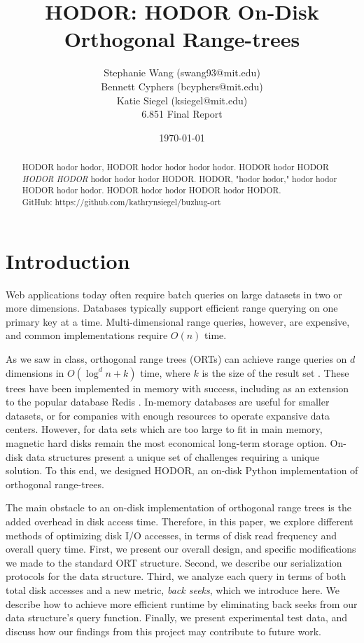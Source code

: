 \documentclass[11pt, oneside]{article}
\title{HODOR: HODOR On-Disk Orthogonal Range-trees}
\author{Stephanie Wang (swang93@mit.edu)\\
Bennett Cyphers (bcyphers@mit.edu)\\
Katie Siegel (ksiegel@mit.edu)\\[2ex]
6.851 Final Report}
\date{\today}
\begin{document}
\maketitle

\vfill

\begin{abstract}

    HODOR hodor hodor, HODOR hodor hodor hodor hodor. HODOR hodor HODOR
    \textit{HODOR HODOR} hodor hodor hodor HODOR. HODOR, "hodor hodor," hodor
    hodor HODOR hodor hodor. HODOR hodor hodor HODOR hodor HODOR. \\

    GitHub: https://github.com/kathrynsiegel/buzhug-ort

\end{abstract}

\clearpage

\section{Introduction}

Web applications today often require batch queries on large datasets in two or
more dimensions. Databases typically support efficient range querying on one
primary key at a time. Multi-dimensional range queries, however, are expensive,
and common implementations require $O(n)$ time. 

As we saw in class, orthogonal range trees (ORTs) can achieve range queries on $d$
dimensions in $O(\log^{d} n + k)$ time, where $k$ is the size of the result set
\cite{lecture}. These trees have been implemented in memory with success,
including as an extension to the popular database Redis \cite{redis}. In-memory
databases are useful for smaller datasets, or for companies with enough
resources to operate expansive data centers. However, for data sets
which are too large to fit in main memory, magnetic hard disks remain the most
economical long-term storage option. On-disk data structures present a unique
set of challenges requiring a unique solution. To this end, we designed HODOR,
an on-disk Python implementation of orthogonal range-trees. 

The main obstacle to an on-disk implementation of orthogonal range trees is the
added overhead in disk access time. Therefore, in this paper, we explore
different methods of optimizing disk I/O accesses, in terms of disk read
frequency and overall query time. First, we present our overall design, and
specific modifications we made to the standard ORT structure. Second, we
describe our serialization protocols for the data structure. Third, we analyze
each query in terms of both total disk accesses and a new metric,
\textit{back seeks}, which we introduce here. We describe how to achieve more
efficient runtime by eliminating back seeks from our data structure's
query function. Finally, we present experimental test data, and discuss how our
findings from this project may contribute to future work.
\end{document}
